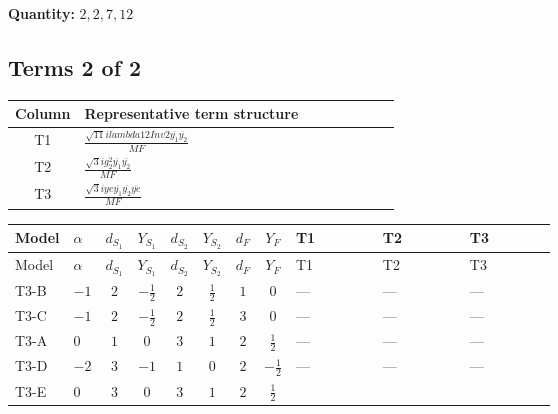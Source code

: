 \documentclass[8pt]{article}
\begin{document}
\begin{landscape}
\begin{longtable}{@{}llcccccc >{\raggedright\arraybackslash}p{0.21\linewidth} >{\raggedright\arraybackslash}p{0.21\linewidth} >{\raggedright\arraybackslash}p{0.21\linewidth}@{}}
\midrule
\bottomrule
\end{longtable}
\clearpage
\noindent\textbf{Quantity: }$\mathrm{2,2,7,12}$\par\smallskip
\subsection*{Terms 2 of 2}
\begin{center}
\begin{tabular}{@{}c >{\raggedright\arraybackslash}p{0.82\linewidth}@{}}
\toprule
Column & Representative term structure \\
\midrule
T1 & \(\displaystyle \frac{\sqrt{11} i lambda12Inv2 \overline{y_{1}} \overline{y_{2}}}{MF}\) \\
\midrule
T2 & \(\displaystyle \frac{\sqrt{3} i g_{2}^{2} \overline{y_{1}} \overline{y_{2}}}{MF}\) \\
\midrule
T3 & \(\displaystyle \frac{\sqrt{3} i ye \overline{y_{1}} \overline{y_{2}} \overline{ye}}{MF}\) \\
\midrule
\bottomrule
\end{tabular}
\end{center}
\smallskip
\tiny
\begin{longtable}{@{}llcccccc >{\raggedright\arraybackslash}p{0.21\linewidth} >{\raggedright\arraybackslash}p{0.21\linewidth} >{\raggedright\arraybackslash}p{0.21\linewidth}@{}}
\toprule
Model & $\alpha$ & $d_{S_1}$ & $Y_{S_1}$ & $d_{S_2}$ & $Y_{S_2}$ & $d_F$ & $Y_F$ & T1 & T2 & T3 \\
\midrule
\endfirsthead
\toprule
Model & $\alpha$ & $d_{S_1}$ & $Y_{S_1}$ & $d_{S_2}$ & $Y_{S_2}$ & $d_F$ & $Y_F$ & T1 & T2 & T3 \\
\midrule
\endhead
T3-B & $-1$ & $2$ & $-\frac{1}{2}$ & $2$ & $\frac{1}{2}$ & $1$ & $0$ & --- & --- & --- \\
\midrule
T3-C & $-1$ & $2$ & $-\frac{1}{2}$ & $2$ & $\frac{1}{2}$ & $3$ & $0$ & --- & --- & --- \\
\midrule
T3-A & $0$ & $1$ & $0$ & $3$ & $1$ & $2$ & $\frac{1}{2}$ & --- & --- & --- \\
\midrule
T3-D & $-2$ & $3$ & $-1$ & $1$ & $0$ & $2$ & $-\frac{1}{2}$ & --- & --- & --- \\
\midrule
T3-E & $0$ & $3$ & $0$ & $3$ & $1$ & $2$ & $\frac{1}{2}$ & \scriptsize\adjustbox{max width=\linewidth}{$\begin{gathered} \frac{3 \sqrt{11} i lambda12Inv2 \overline{y_{1}} \overline{y_{2}}}{22 MF}\end{gathered}$} & \scriptsize\adjustbox{max width=\linewidth}{$\begin{gathered} \frac{11 \sqrt{3} i g_{2}^{2} \overline{y_{1}} \overline{y_{2}}}{8 MF}\end{gathered}$} & \scriptsize\adjustbox{max width=\linewidth}{$\begin{gathered} - \frac{\sqrt{3} i ye \overline{y_{1}} \overline{y_{2}} \overline{ye}}{12 MF}\end{gathered}$} \\

\end{longtable}
\end{landscape}
\end{document}
